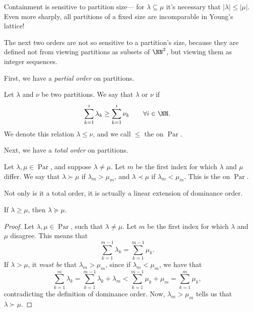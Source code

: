 \documentclass{article}
\DeclareMathOperator{\Par}{Par}
\begin{document}
Containment is sensitive to partition size--- for $\lambda \subseteq \mu$ it's necessary that $|\lambda| \leq |\mu|$.
Even more sharply, all partitions of a fixed size are incomparable in Young's lattice!

The next two orders are not so sensitive to a partition's size, because they are defined not from viewing partitions as subsets of $\NN^2$, but viewing them as integer sequences.

First, we have a \textit{partial order} on partitions.

\begin{definition}
    Let $\lambda$ and $\nu$ be two partitions. We say that $\lambda$  or  $\nu$ if
    \[
        \sum_{k=1}^i \lambda_k \geq \sum_{k=1}^i \nu_k \qquad \forall i\in\NN.
    \]
    We denote this relation $\lambda \leq \nu$, and we call $\leq$ the  on $\Par$.
\end{definition}

Next, we have a \textit{total order} on partitions.

\begin{definition}
    Let $\lambda, \mu \in \Par$, and suppose $\lambda \neq \mu$.
    Let $m$ be the first index for which $\lambda$ and $\mu$ differ.
    We say that $\lambda \succ \mu$ if $\lambda_m > \mu_m$, and $\lambda \prec \mu$ if $\lambda_m < \mu_m$.
    This is the  on $\Par$.
\end{definition}

Not only is it a total order, it is actually a linear extension of dominance order.

\begin{theorem}
    \label{thm:LexIsLinearExtensionOfDominance}
    If $\lambda \geq \mu$, then $\lambda \succeq \mu$.
\end{theorem}

\begin{proof}
    Let $\lambda, \mu \in \Par$, such that $\lambda \neq \mu$.
    Let $m$ be the first index for which $\lambda$ and $\mu$ disagree.
    This means that
    \[
        \sum_{k=1}^{m-1} \lambda_k = \sum_{k=1}^{m-1} \mu_k.
    \]
    If $\lambda > \mu$, it \textit{must be} that $\lambda_m > \mu_m$, since if $\lambda_m < \mu_m$, we have that
    \[
        \sum_{k=1}^m \lambda_k = \sum_{k=1}^{m-1} \lambda_k + \lambda_m < \sum_{k=1}^{m-1} \mu_k + \mu_m = \sum_{k=1}^m \mu_k,
    \]
    contradicting the definition of dominance order.
    Now, $\lambda_m > \mu_m$ tells us that $\lambda \succ \mu$.
\end{proof}
\end{document}
